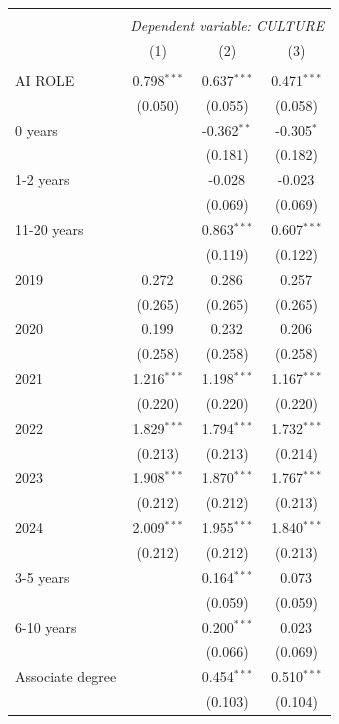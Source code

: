 \begin{table}[!htbp] \centering
\begin{tabular}{@{\extracolsep{5pt}}lccc}
\\[-1.8ex]\hline
\hline \\[-1.8ex]
& \multicolumn{3}{c}{\textit{Dependent variable: CULTURE}} \
\cr \cline{2-4}
\\[-1.8ex] & (1) & (2) & (3) \\
\hline \\[-1.8ex]
 AI ROLE & 0.798$^{***}$ & 0.637$^{***}$ & 0.471$^{***}$ \\
& (0.050) & (0.055) & (0.058) \\
 0 years & & -0.362$^{**}$ & -0.305$^{*}$ \\
& & (0.181) & (0.182) \\
 1-2 years & & -0.028$^{}$ & -0.023$^{}$ \\
& & (0.069) & (0.069) \\
 11-20 years & & 0.863$^{***}$ & 0.607$^{***}$ \\
& & (0.119) & (0.122) \\
 2019 & 0.272$^{}$ & 0.286$^{}$ & 0.257$^{}$ \\
& (0.265) & (0.265) & (0.265) \\
 2020 & 0.199$^{}$ & 0.232$^{}$ & 0.206$^{}$ \\
& (0.258) & (0.258) & (0.258) \\
 2021 & 1.216$^{***}$ & 1.198$^{***}$ & 1.167$^{***}$ \\
& (0.220) & (0.220) & (0.220) \\
 2022 & 1.829$^{***}$ & 1.794$^{***}$ & 1.732$^{***}$ \\
& (0.213) & (0.213) & (0.214) \\
 2023 & 1.908$^{***}$ & 1.870$^{***}$ & 1.767$^{***}$ \\
& (0.212) & (0.212) & (0.213) \\
 2024 & 2.009$^{***}$ & 1.955$^{***}$ & 1.840$^{***}$ \\
& (0.212) & (0.212) & (0.213) \\
 3-5 years & & 0.164$^{***}$ & 0.073$^{}$ \\
& & (0.059) & (0.059) \\
 6-10 years & & 0.200$^{***}$ & 0.023$^{}$ \\
& & (0.066) & (0.069) \\
 Associate degree & & 0.454$^{***}$ & 0.510$^{***}$ \\
& & (0.103) & (0.104) \\

\end{tabular}
\end{table}
